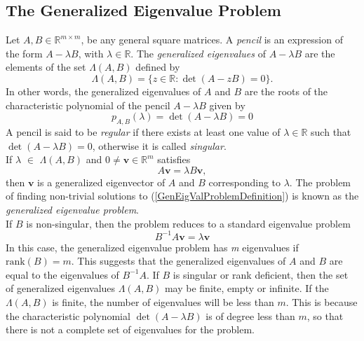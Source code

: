\subsection{The Generalized Eigenvalue Problem}\label{sec:GeneralizedEigValProblem}
Let $A, B \in \mathbb{R}^{m\times m}$, be any general square matrices. A \textit{pencil} is an expression of the form $A - \lambda B$, with $\lambda \in \mathbb{R}$.  The \textit{generalized eigenvalues} of $A - \lambda B$ are the elements of the set $\Lambda(A, B)$ defined by
\begin{equation}\label{eq:GeneralizedEigValDefinition}
	\Lambda(A, B) = \{z \in \mathbb{R}: \det(A-zB) = 0\}.
\end{equation}
In other words, the generalized eigenvalues of $A$ and $B$ are the roots of the characteristic polynomial of the pencil $A- \lambda B$ given by
\begin{equation}\label{eq:GeneralizedXteristicPolynomial}
	p_{A, B}(\lambda) = \det(A-\lambda B) = 0
\end{equation}
A pencil is said to be \textit{regular} if there exists at least one value of $\lambda \in \mathbb{R}$ such that $\det(A-\lambda B) = 0$, otherwise it is called \textit{singular}.\\
If $\lambda$ $\in$ $\Lambda(A, B)$ and $0 \neq \mathbf{v} \in \mathbb{R}^m$ satisfies
\begin{equation}\label{GenEigValProblemDefinition}
	A\mathbf{v} = \lambda B\mathbf{v},
\end{equation}
then $\mathbf{v}$ is a generalized eigenvector of $A$ and $B$ corresponding to $\lambda$. The problem of finding non-trivial solutions to (\ref{GenEigValProblemDefinition}) is known as the \textit{generalized eigenvalue problem}.\\
If $B$ is non-singular, then the problem reduces to a standard eigenvalue problem
\begin{equation}\label{eq:StandardReduction}
	B^{-1}A \mathbf{v} = \lambda \mathbf{v}
\end{equation}
In this case, the generalized eigenvalue problem has \textit{m} eigenvalues if $\text{rank}(B) = m$. This suggests that the generalized eigenvalues of $A$ and $B$ are equal to the eigenvalues of $B^{-1}A$. If $B$ is singular or rank deficient, then the set of generalized eigenvalues $\Lambda(A, B)$ may be finite, empty or infinite. If the $\Lambda(A, B)$ is finite, the number of eigenvalues will be less than $m$. This is because the characteristic polynomial $\det(A- \lambda B)$ is of degree less than $m$, so that there is not a complete set of eigenvalues for the problem.\\
